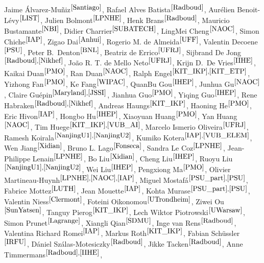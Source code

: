 \documentclass[a4paper,11pt]{article}
\begin{document}
Jaime \'Alvarez-Mu\~niz$^{\ref{Santiago}}$,
Rafael Alves Batista$^{\ref{Radboud}}$,
Aur\'elien Benoit-L\'evy$^{\ref{LIST}}$,
Julien Bolmont$^{\ref{LPNHE}}$,
Henk Brans$^{\ref{Radboud}}$,
Mauricio Bustamante$^{\ref{NBI}}$, 
Didier Charrier$^{\ref{SUBATECH}}$,
LingMei Cheng$^{\ref{NAOC}}$,
Simon Chiche$^{\ref{IAP}}$,
Zigao Dai$^{\ref{Anhui}}$,
Rogerio M. de Almeida$^{\ref{UFF}}$,
Valentin Decoene$^{\ref{PSU}}$,
Peter B.\ Denton$^{\ref{BNL}}$, 
Beatriz de Errico$^{\ref{UFRJ}}$,
Sijbrand De Jong$^{\ref{Radboud},\ref{Nikhef}}$,
João R. T. de Mello Neto$^{\ref{UFRJ}}$,
Krijn D.\ De Vries$^{\ref{IIHE}}$,
Kaikai Duan$^{\ref{PMO}}$,
Ran Duan$^{\ref{NAOC}}$,
Ralph Engel$^{\ref{KIT_IKP},\ref{KIT_ETP}}$,
Yizhong Fan$^{\ref{PMO}}$,
Ke Fang$^{\ref{WIPAC}}$,
QuanBu Gou$^{\ref{IHEP}}$,
Junhua Gu$^{\ref{NAOC}}$,
Claire Gu\'epin$^{\ref{Maryland},\ref{JSSI}}$,
Jianhua Guo$^{\ref{PMO}}$,
Yiqing Guo$^{\ref{IHEP}}$,
Rene Habraken$^{\ref{Radboud},\ref{Nikhef}}$,
Andreas Haungs$^{\ref{KIT_IKP}}$,
Haoning He$^{\ref{PMO}}$,
Eric Hivon$^{\ref{IAP}}$,
Hongbo Hu$^{\ref{IHEP}}$,
Xiaoyuan Huang$^{\ref{PMO}}$,
Yan Huang$^{\ref{NAOC}}$,
Tim Huege$^{\ref{KIT_IKP},\ref{VUB_AI}}$,
Marcelo Ismerio Oliveira$^{\ref{UFRJ}}$,
Ramesh Koirala$^{\ref{NanjingU1},\ref{NanjingU2}}$,
Kumiko Kotera$^{\ref{IAP},\ref{VUB_ELEM}}$,
Wen Jiang$^{\ref{Xidian}}$,
Bruno L. Lago$^{\ref{Fonseca}}$,
Sandra Le Coz$^{\ref{LPNHE}}$, 
Jean-Philippe Lenain$^{\ref{LPNHE}}$,
Bo Liu$^{\ref{Xidian}}$,
Cheng Liu$^{\ref{IHEP}}$,
Ruoyu Liu$^{\ref{NanjingU1},\ref{NanjingU2}}$,
Wei Liu$^{\ref{IHEP}}$,
Pengxiong Ma$^{\ref{PMO}}$,
Olivier Martineau-Huynh$^{\ref{LPNHE},\ref{NAOC}, \ref{IAP}}$,
Miguel Mostaf\'a$^{\ref{PSU_part},\ref{PSU}}$,
Fabrice Mottez$^{\ref{LUTH}}$, 
Jean Mouette$^{\ref{IAP}}$, 
Kohta Murase$^{\ref{PSU_part},\ref{PSU}}$,
Valentin Niess$^{\ref{Clermont}}$,
Foteini Oikonomou$^{\ref{UTrondheim}}$,
Ziwei Ou$^{\ref{SunYatsen}}$,
Tanguy Pierog$^{\ref{KIT_IKP}}$,
Lech Wiktor Piotrowski$^{\ref{UWarsaw}}$,
Simon Prunet$^{\ref{Lagrange}}$,
Xiangli Qian$^{\ref{SDMU}}$,
Inge van Rens$^{\ref{Radboud}}$,
Valentina Richard Romei$^{\ref{IAP}}$,
Markus Roth$^{\ref{KIT_IKP}}$,
Fabian Sch\"ussler$^{\ref{IRFU}}$, 
Dániel Szálas-Motesiczky$^{\ref{Radboud}}$, 
Jikke Tacken$^{\ref{Radboud}}$, 
Anne Timmermans$^{\ref{Radboud},\ref{IIHE}}$,
\end{document}
